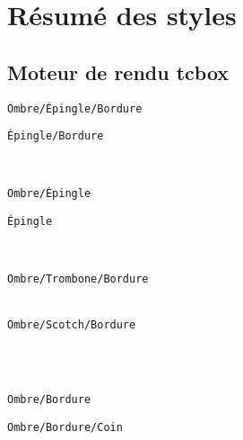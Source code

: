 \documentclass[french,a4paper,11pt]{article}
\begin{document}
\pagebreak

\section{Résumé des styles}

\subsection{Moteur de rendu tcbox}

\begin{DemoCode}
\hfill\begin{PostIt}
\texttt{Ombre/Épingle/Bordure}
\end{PostIt}
\begin{PostIt}[Ombre=false]
\texttt{Épingle/Bordure}
\end{PostIt}\hfill~

\medskip

\hfill\begin{PostIt}[Bordure=false]
\texttt{Ombre/Épingle}
\end{PostIt}
\begin{PostIt}[Bordure=false,Ombre=false]
\texttt{Épingle}
\end{PostIt}\hfill~

\medskip

\hfill\begin{PostIt}[Attache=Trombone]
\texttt{Ombre/Trombone/Bordure}\\
~
\end{PostIt}
\begin{PostIt}[Attache=Scotch]
\texttt{Ombre/Scotch/Bordure}\\
~
\end{PostIt}\hfill~

\medskip

\hfill\begin{PostIt}[Attache=Non]
\texttt{Ombre/Bordure}
\end{PostIt}
\begin{PostIt}[Coin,Attache=Non]
\texttt{Ombre/Bordure/Coin}
\end{PostIt}\hfill~

\vspace{1cm}

\hfill\begin{PostIt}[Titre={Lipsum[1][1-4]},PoliceTitre={\large\sffamily},Inclinaison=5,Couleur=pink,Hauteur=6cm,Attache=Scotch,AlignementV=center,Coin]
\lipsum[1][1-4]
\end{PostIt}\hfill~
\end{DemoCode}
\end{document}
